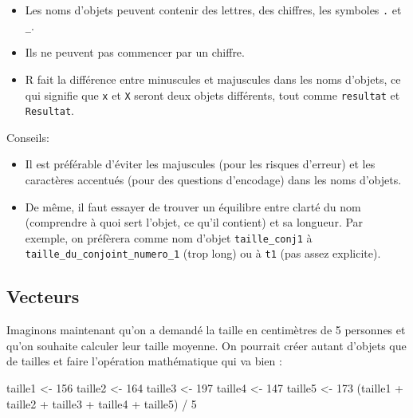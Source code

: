 \documentclass[
]{article}
\newenvironment{Shaded}{\begin{snugshade}}{\end{snugshade}}
\newcommand{\DecValTok}[1]{\textcolor[rgb]{0.00,0.00,0.81}{#1}}
\newcommand{\NormalTok}[1]{#1}
\newcommand{\OtherTok}[1]{\textcolor[rgb]{0.56,0.35,0.01}{#1}}
\newcommand{\SpecialCharTok}[1]{\textcolor[rgb]{0.00,0.00,0.00}{#1}}
\begin{document}
\begin{infobox}
\begin{itemize}
\item
  Les noms d'objets peuvent contenir des lettres, des chiffres, les
  symboles \texttt{.} et \texttt{\_}.
\item
  Ils ne peuvent pas commencer par un chiffre.
\item
  R fait la différence entre minuscules et majuscules dans les noms
  d'objets, ce qui signifie que \texttt{x} et \texttt{X} seront deux
  objets différents, tout comme \texttt{resultat} et \texttt{Resultat}.
\end{itemize}

Conseils:

\begin{itemize}
\item
  Il est préférable d'éviter les majuscules (pour les risques d'erreur)
  et les caractères accentués (pour des questions d'encodage) dans les
  noms d'objets.
\item
  De même, il faut essayer de trouver un équilibre entre clarté du nom
  (comprendre à quoi sert l'objet, ce qu'il contient) et sa longueur.
  Par exemple, on préfèrera comme nom d'objet \texttt{taille\_conj1} à
  \texttt{taille\_du\_conjoint\_numero\_1} (trop long) ou à \texttt{t1}
  (pas assez explicite).
\end{itemize}
\end{infobox}

\hypertarget{vecteurs}{%
\subsection{Vecteurs}\label{vecteurs}}

Imaginons maintenant qu'on a demandé la taille en centimètres de 5
personnes et qu'on souhaite calculer leur taille moyenne. On pourrait
créer autant d'objets que de tailles et faire l'opération mathématique
qui va bien :

\begin{Shaded}
\begin{Highlighting}[]
\NormalTok{taille1 }\OtherTok{\textless{}{-}} \DecValTok{156}
\NormalTok{taille2 }\OtherTok{\textless{}{-}} \DecValTok{164}
\NormalTok{taille3 }\OtherTok{\textless{}{-}} \DecValTok{197}
\NormalTok{taille4 }\OtherTok{\textless{}{-}} \DecValTok{147}
\NormalTok{taille5 }\OtherTok{\textless{}{-}} \DecValTok{173}
\NormalTok{(taille1 }\SpecialCharTok{+}\NormalTok{ taille2 }\SpecialCharTok{+}\NormalTok{ taille3 }\SpecialCharTok{+}\NormalTok{ taille4 }\SpecialCharTok{+}\NormalTok{ taille5) }\SpecialCharTok{/} \DecValTok{5}
\end{Highlighting}
\end{Shaded}
\end{document}
